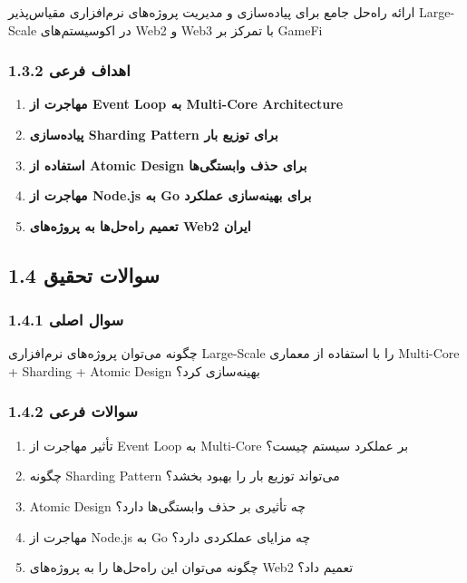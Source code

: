 \documentclass[
]{article}
\providecommand{\tightlist}{%
  \setlength{\itemsep}{0pt}\setlength{\parskip}{0pt}}
\begin{document}
ارائه راه‌حل جامع برای پیاده‌سازی و مدیریت پروژه‌های نرم‌افزاری مقیاس‌پذیر
Large-Scale در اکوسیستم‌های Web2 و Web3 با تمرکز بر GameFi

\subsubsection{1.3.2 اهداف
فرعی}\label{ux627ux647ux62fux627ux641-ux641ux631ux639ux6cc}

\begin{enumerate}
\def\labelenumi{\arabic{enumi}.}
\tightlist
\item
  \textbf{مهاجرت از Event Loop به Multi-Core Architecture}
\item
  \textbf{پیاده‌سازی Sharding Pattern برای توزیع بار}
\item
  \textbf{استفاده از Atomic Design برای حذف وابستگی‌ها}
\item
  \textbf{مهاجرت از Node.js به Go برای بهینه‌سازی عملکرد}
\item
  \textbf{تعمیم راه‌حل‌ها به پروژه‌های Web2 ایران}
\end{enumerate}

\subsection{1.4 سوالات
تحقیق}\label{ux633ux648ux627ux644ux627ux62a-ux62aux62dux642ux6ccux642}

\subsubsection{1.4.1 سوال
اصلی}\label{ux633ux648ux627ux644-ux627ux635ux644ux6cc}

چگونه می‌توان پروژه‌های نرم‌افزاری Large-Scale را با استفاده از معماری
Multi-Core + Sharding + Atomic Design بهینه‌سازی کرد؟

\subsubsection{1.4.2 سوالات
فرعی}\label{ux633ux648ux627ux644ux627ux62a-ux641ux631ux639ux6cc}

\begin{enumerate}
\def\labelenumi{\arabic{enumi}.}
\tightlist
\item
  تأثیر مهاجرت از Event Loop به Multi-Core بر عملکرد سیستم چیست؟
\item
  چگونه Sharding Pattern می‌تواند توزیع بار را بهبود بخشد؟
\item
  Atomic Design چه تأثیری بر حذف وابستگی‌ها دارد؟
\item
  مهاجرت از Node.js به Go چه مزایای عملکردی دارد؟
\item
  چگونه می‌توان این راه‌حل‌ها را به پروژه‌های Web2 تعمیم داد؟
\end{enumerate}
\end{document}
